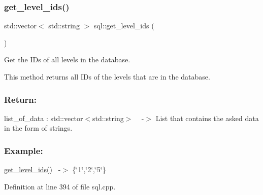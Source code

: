\subsubsection{\texorpdfstring{get\+\_\+level\+\_\+ids()}{get\_level\_ids()}}
{\footnotesize\ttfamily std\+::vector$<$ std\+::string $>$ sql\+::get\+\_\+level\+\_\+ids (\begin{DoxyParamCaption}{ }\end{DoxyParamCaption})}



Get the ID\textquotesingle{}s of all levels in the database. 

This method returns all ID\textquotesingle{}s of the levels that are in the database.~\newline


\subsubsection*{Return\+: }

list\+\_\+of\+\_\+data \+: std\+::vector$<$std\+::string$>$ ~\newline
-\/$>$ List that contains the asked data in the form of strings.

\subsubsection*{Example\+: }

\hyperlink{classsql_a9928c456c632f88d19cce26b8165bd6f}{get\+\_\+level\+\_\+ids()}~\newline
-\/$>$ \{\char`\"{}1\char`\"{},\char`\"{}2\char`\"{},\char`\"{}5\char`\"{}\} 

Definition at line 394 of file sql.\+cpp.

